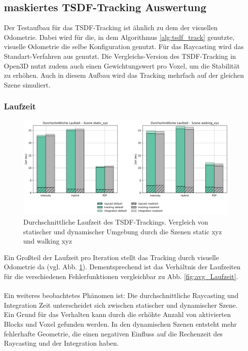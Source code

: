 \documentclass[12pt,DIV=15,BCOR=15mm,twoside,headsepline,abstract=true,listof=totoc,bibliography=totoc]{scrreprt}
\theoremstyle{remark}    %
\begin{document}
    \subsection{maskiertes TSDF-Tracking Auswertung}
    Der Testaufbau für das \ac{TSDF}-Tracking ist ähnlich zu dem der visuellen Odometrie.
    Dabei wird für die, in dem Algorithmus \ref{alg:tsdf_track} genutzte, visuelle Odometrie die selbe Konfiguration genutzt. Für das Raycasting wird das 
    Standart-Verfahren aus \cite{dong2023ashmodernframeworkparallel,Zhou2018} genutzt. Die Vergleichs-Version des \ac{TSDF}-Tracking in Open3D nutzt zudem auch einen
    Gewichtungswert pro Voxel, um die Stabilität zu erhöhen. Auch in diesem Aufbau wird das Tracking mehrfach auf der gleichen Szene simuliert.
    
    \subsubsection{Laufzeit}
    \begin{figure}[h]
        \centering
        \includegraphics[width=\textwidth]{pics/tsdf_time_avg_split.png}
        \caption{Durchschnittliche Laufzeit des \ac{TSDF}-Trackings. Vergleich von statischer und dynamischer Umgebung durch die Szenen \glqq static xyz \grqq
        und \glqq walking xyz \grqq}
        \label{fig:tsdf_avg_time}
    \end{figure}\noindent
    Ein Großteil der Laufzeit pro Iteration stellt das Tracking durch visuelle Odometrie da (vgl. Abb. \ref{fig:tsdf_avg_time}). Dementsprechend ist das 
    Verhältnis der Laufzeiten für die verschiedenen Fehlerfunktionen vergleichbar zu Abb. \ref{fig:avg_Laufzeit}. \\\\
    Ein weiteres beobachtetes Phänomen ist: Die durchschnittliche Raycasting und Integration Zeit unterscheidet sich zwischen statischer und dynamischer
    Szene. Ein Grund für das Verhalten kann durch die erhöhte Anzahl von aktivierten Blocks und Voxel gefunden werden. In den dynamischen Szenen entsteht
    mehr fehlerhafte Geometrie, die einen negativen Einfluss auf die Rechenzeit des Raycasting und der Integration haben. \\\\
\end{document}
